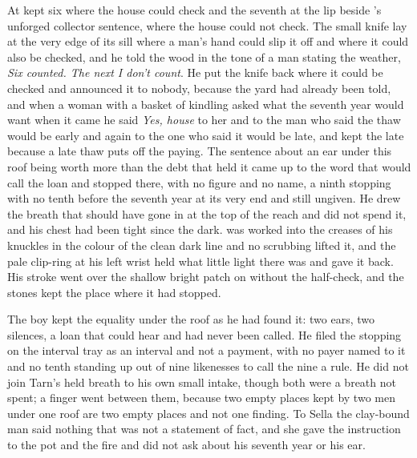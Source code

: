 At   kept six where the house could check and the seventh at the lip beside 's unforged collector sentence, where the house could not check. The small knife lay at the very edge of its sill where a man's hand could slip it off and where it could also be checked, and he told the wood in the tone of a man stating the weather, \emph{Six counted. The next I don't count}. He put the knife back where it could be checked and announced it to nobody, because the yard had already been told, and when a woman with a basket of kindling asked what the seventh year would want when it came he said \emph{Yes, house} to her and to the man who said the thaw would be early and again to the one who said it would be late, and kept the late because a late thaw puts off the paying. The sentence about an ear under this roof being worth more than the debt that held it came up to the word that would call the loan and stopped there, with no figure and no name, a ninth stopping with no tenth before the seventh year at its very end and still ungiven. He drew the breath that should have gone in at the top of the reach and did not spend it, and his chest had been tight since the dark.  was worked into the creases of his knuckles in the colour of the clean dark line and no scrubbing lifted it, and the pale clip-ring at his left wrist held what little light there was and gave it back. His stroke went over the shallow bright patch on  without the half-check, and the stones kept the place where it had stopped.

The boy kept the equality under the roof as he had found it: two ears, two silences, a loan that could hear and had never been called. He filed the stopping on the interval tray as an interval and not a payment, with no payer named to it and no tenth standing up out of nine likenesses to call the nine a rule. He did not join Tarn's held breath to his own small intake, though both were a breath not spent; a finger went between them, because two empty places kept by two men under one roof are two empty places and not one finding. To Sella the clay-bound man said nothing that was not a statement of fact, and she gave the instruction to the pot and the fire and did not ask about his seventh year or his ear.

